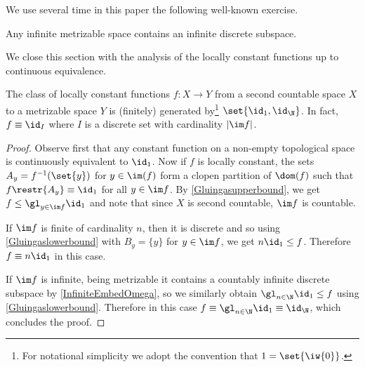 We use several time in this paper the following well-known exercise.

\begin{fact}\label{InfiniteEmbedOmega}
Any infinite metrizable space contains an infinite discrete subspace.
\end{fact}

We close this section with the analysis of the locally constant functions up to continuous equivalence.

\begin{proposition}\label{LocallyConstantFunctions}
The class of locally constant functions $f:X\to Y$ from a second countable space $X$ to a metrizable space $Y$ is (finitely) generated by\footnote{For notational simplicity we adopt the convention that $1=\set{\iw{0}}$.} $\set{\id_{1},\id_\N}$. In fact, $f\equiv \id_{I}$ where $I$ is a discrete set with cardinality $|\im f|$. 
\end{proposition}
\begin{proof}
Observe first that any constant function on a non-empty topological space is continuously equivalent to $\id_{1}$.
Now if $f$ is locally constant, the sets $A_y=f^{-1}(\set{y})$ for $y\in\im(f)$ form a clopen partition of $\dom(f)$ such that $f\restr{A_y}\equiv \id_{1}$ for all $y\in \im f$.
By \cref{Gluingasupperbound}, we get $f\leq \gl_{y\in \im f} \id_{1}$ and note that since $X$ is second countable, $\im f$ is countable. 

If $\im f$ is finite of cardinality $n$, then it is discrete and so using \cref{Gluingaslowerbound} with $B_y=\{y\}$ for $y\in \im f$,
we get $n \id_{1} \leq f$. Therefore $f\equiv n  \id_{1}$ in this case.

If $\im f$ is infinite, being metrizable it contains a countably infinite discrete subspace by \cref{InfiniteEmbedOmega},
so we similarly obtain $\gl_{n\in\N} \id_{1} \leq f$ using \cref{Gluingaslowerbound}.
Therefore in this case $f\equiv \gl_{n\in\N} \id_{1} \equiv \id_{\N}$, which concludes the proof.
\end{proof}

